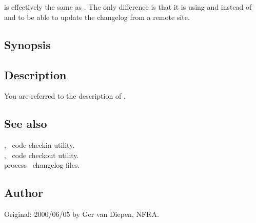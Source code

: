  
\newpage
\section{}
\label{rac}
 
 is effectively the same as . The only difference
is that it is using  and  instead of
 and  to be able to update the changelog
from a remote site.

\subsection*{Synopsis}
 
\begin{synopsis}
\end{synopsis}
 
\subsection*{Description}
You are referred to the description of .

\subsection*{See also}

, \aipspp\ code checkin utility.\\
, \aipspp\ code checkout utility.\\
 process \aipspp\ changelog files.
 
\subsection*{Author}
 
Original: 2000/06/05 by Ger van Diepen, NFRA.

 
\newpage
\section{}
\label{rai}
 
